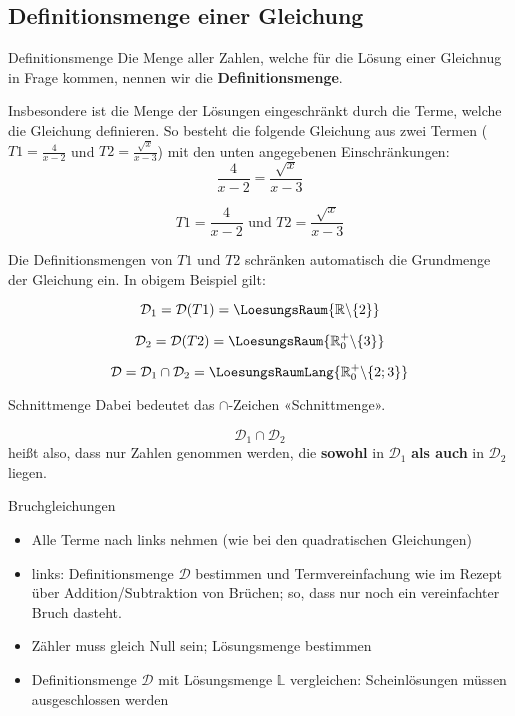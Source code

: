 \newpage

  
\subsection{Definitionsmenge einer
    Gleichung}

\begin{definition}{Definitionsmenge}{}  Die Menge aller Zahlen, welche für die Lösung einer Gleichnug in Frage kommen,
  nennen wir die \textbf{Definitionsmenge}.
\end{definition}

  Insbesondere ist die Menge der Lösungen eingeschränkt durch
  die Terme, welche die Gleichung definieren. So besteht die folgende
  Gleichung aus zwei Termen ($T1=\frac{4}{x-2}$ und $T2=\frac{\sqrt{x}}{x-3}$) mit den unten angegebenen
  Einschränkungen:
  $$\frac{4}{x-2}=\frac{\sqrt{x}}{x-3}$$

$$T1=\frac{4}{x-2} \text{ und } T2=\frac{\sqrt{x}}{x-3}$$
  
  Die Definitionsmengen von $T1$ und $T2$ schränken automatisch die
  Grundmenge der Gleichung ein. In obigem Beispiel gilt:
  
  $$\mathcal{D}_1=\mathcal{D}(T1)=\LoesungsRaum{\mathbb{R}\backslash\{2\}}$$

  $$\mathcal{D}_2=\mathcal{D}(T2)=\LoesungsRaum{\mathbb{R}^+_0\backslash\{3\}}$$

  $$\mathcal{D}=\mathcal{D}_1\cap\mathcal{D}_2=\LoesungsRaumLang{\mathbb{R}^{+}_{0}\backslash\{2;3\}}$$

  \begin{bemerkung}{Schnittmenge}{}
    Dabei bedeutet das $\cap$-Zeichen «Schnittmenge».

    $$\mathcal{D}_1\cap\mathcal{D}_2$$
    heißt also, dass nur Zahlen genommen werden, die \textbf{sowohl}
    in $\mathcal{D}_1$ \textbf{als auch} in $\mathcal{D}_2$ liegen.
    \end{bemerkung}

  \newpage
    
\begin{rezept}{Bruchgleichungen}{}
  \begin{itemize}
  \item Alle Terme nach links nehmen (wie bei den quadratischen Gleichungen)
  \item links: Definitionsmenge $\mathcal{D}$ bestimmen und
    Termvereinfachung wie im Rezept über Addition/Subtraktion von
    Brüchen\fi{}; so, dass nur noch ein vereinfachter Bruch dasteht.
  \item Zähler muss gleich Null sein; Lösungsmenge bestimmen
   \item Definitionsmenge $\mathcal{D}$ mit Lösungsmenge $\mathbb{L}$
     vergleichen: Scheinlösungen müssen ausgeschlossen werden
  \end{itemize}
  
\end{rezept}

